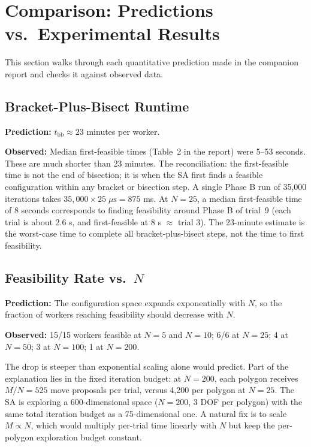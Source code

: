 \documentclass[11pt,oneside]{article}
\begin{document}
\section{Comparison: Predictions vs.\ Experimental Results}
\label{sec:comparison}

This section walks through each quantitative prediction made in the
companion report and checks it against observed data.

\subsection{Bracket-Plus-Bisect Runtime}

\textbf{Prediction:} $t_{\mathrm{bb}} \approx 23$ minutes per worker.

\textbf{Observed:} Median first-feasible times (Table~2 in the report)
were 5--53 seconds. These are much shorter than 23 minutes. The
reconciliation: the first-feasible time is not the end of bisection;
it is when the SA first finds a feasible configuration within any
bracket or bisection step. A single Phase B run of 35{,}000 iterations
takes $35{,}000 \times 25\;\mu\mathrm{s} = 875$ ms. At $N = 25$, a
median first-feasible time of 8 seconds corresponds to finding
feasibility around Phase B of trial~9 (each trial is about 2.6 s, and
first-feasible at 8 s $\approx$ trial 3). The 23-minute estimate is
the worst-case time to complete all bracket-plus-bisect steps, not the
time to first feasibility.

\subsection{Feasibility Rate vs.\ $N$}

\textbf{Prediction:} The configuration space expands exponentially
with $N$, so the fraction of workers reaching feasibility should
decrease with $N$.

\textbf{Observed:} 15/15 workers feasible at $N = 5$ and $N = 10$;
6/6 at $N = 25$; 4 at $N = 50$; 3 at $N = 100$; 1 at $N = 200$.

The drop is steeper than exponential scaling alone would predict.
Part of the explanation lies in the fixed iteration budget: at $N =
200$, each polygon receives $M/N = 525$ move proposals per trial,
versus 4{,}200 per polygon at $N = 25$. The SA is exploring a 600-dimensional
space ($N = 200$, 3 DOF per polygon) with the same total iteration
budget as a 75-dimensional one. A natural fix is to scale $M \propto N$,
which would multiply per-trial time linearly with $N$ but keep the
per-polygon exploration budget constant.
\end{document}
